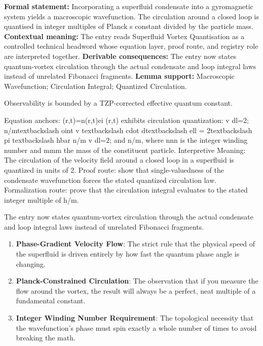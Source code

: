 \begingroup\footnotesize\setlength{\emergencystretch}{3em}\sloppy
\textbf{Formal statement:} Incorporating a superfluid condensate into a gyromagnetic system yields a macroscopic wavefunction. The circulation around a closed loop is quantised in integer multiples of Planck s constant divided by the particle mass. \textbf{Contextual meaning:} The entry reads Superfluid Vortex Quantisation as a controlled technical headword whose equation layer, proof route, and registry role are interpreted together. \textbf{Derivable consequences:} The entry now states quantum-vortex circulation through the actual condensate and loop integral laws instead of unrelated Fibonacci fragments. \textbf{Lemma support:} Macroscopic Wavefunction; Circulation Integral; Quantized Circulation.\par
\endgroup

Observability is bounded by a TZP-corrected effective quantum constant.

Equation anchors: (r,t)=n(r,t)ei (r,t) exhibits circulation quantization:  v dl=2;  n/mtextbackslash oint v textbackslash cdot dtextbackslash ell = 2textbackslash pi textbackslash hbar n/m v dl=2; and  n/m, where nnn is the integer winding number and mmm the mass of the constituent particle. Interpretive Meaning: The circulation of the velocity field around a closed loop in a superfluid is quantized in units of 2. Proof route: show that single-valuedness of the condensate wavefunction forces the stated quantized circulation law. Formalization route: prove that the circulation integral evaluates to the stated integer multiple of h/m.

The entry now states quantum-vortex circulation through the actual condensate and loop integral laws instead of unrelated Fibonacci fragments.
\endgroup

\begin{enumerate}[leftmargin=1.6em,itemsep=6pt,topsep=4pt]
\item \textbf{Phase-Gradient Velocity Flow}: The strict rule that the physical speed of the superfluid is driven entirely by how fast the quantum phase angle is changing.
\item \textbf{Planck-Constrained Circulation}: The observation that if you measure the flow around the vortex, the result will always be a perfect, neat multiple of a fundamental constant.
\item \textbf{Integer Winding Number Requirement}: The topological necessity that the wavefunction's phase must spin exactly a whole number of times to avoid breaking the math.
\end{enumerate}

